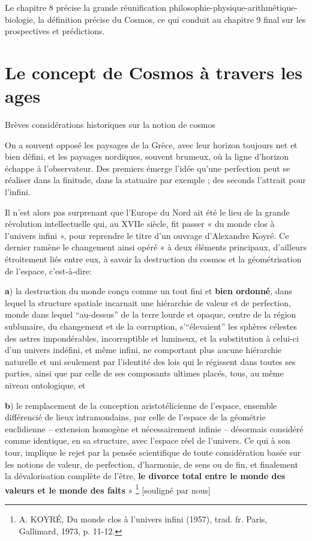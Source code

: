 \documentclass[a4paper,12pt]{article}
\begin{document}
Le chapitre 8 précise la grande réunification philosophie-physique-arithmétique-biologie, la définition précise du Cosmos, ce qui conduit au chapitre 9 final sur les prospectives et prédictions.


\section{Le concept de Cosmos à travers les ages}

Brèves considérations historiques sur la notion de cosmos

On a souvent opposé les paysages de la Grèce, avec leur horizon toujours net et bien défini, et les paysages nordiques, souvent brumeux, où la ligne d'horizon échappe à l'observateur. Des premiers émerge l'idée qu'une perfection peut se réaliser dans la finitude, dans la statuaire par exemple ; des seconds l'attrait pour l'infini. 

Il n'est alors pas surprenant que l'Europe du Nord ait été le lieu de la grande révolution intellectuelle qui, au XVIIe siècle, fit passer « du monde clos à l'univers infini », pour reprendre le titre d'un ouvrage d'Alexandre Koyré. Ce dernier ramène le changement ainsi opéré « à deux éléments principaux, d'ailleurs étroitement liés entre eux, à savoir la destruction du cosmos et la géométrisation de l'espace, c'est-à-dire:

\textbf{a}) la destruction du monde conçu comme un tout fini et  \textbf{bien ordonné}, dans lequel la structure spatiale incarnait une hiérarchie de valeur et de perfection, monde dans lequel “au-dessus” de la terre lourde et opaque, centre de la région sublunaire, du changement et de la corruption, s'“élevaient” les sphères célestes des astres impondérables, incorruptible et lumineux, et la substitution à celui-ci d'un univers indéfini, et même infini, ne comportant plus aucune hiérarchie naturelle et uni seulement par l'identité des lois qui le régissent dans toutes ses parties, ainsi que par celle de ses composants ultimes placés, tous, au même niveau ontologique, et 

\textbf{b}) le remplacement de la conception aristotélicienne de l'espace, ensemble différencié de lieux intramondains, par celle de l'espace de la géométrie euclidienne – extension homogène et nécessairement infinie  – désormais considéré comme identique, en sa structure, avec l'espace réel de l'univers. Ce qui à son tour, implique le rejet par la pensée scientifique de toute considération basée sur les notions de valeur, de perfection, d'harmonie, de sens ou de fin, et finalement la dévalorisation complète de l’être, \textbf{le divorce total entre le monde des valeurs et le monde des faits} » \footnote{A. KOYRÉ, Du monde clos à l’univers infini (1957), trad. fr. Paris, Gallimard, 1973, p. 11-12.} [souligné par nous]
\end{document}
